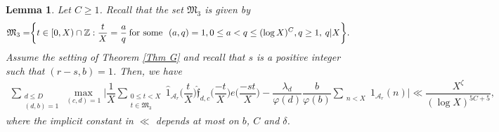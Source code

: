 \documentclass[12pt]{amsart}
\numberwithin{equation}{section}
\newtheorem{lemma}[theorem]{Lemma}
\theoremstyle{remark}
\theoremstyle{definition}
\begin{document}
\begin{lemma}\label{Majorarc3}
Let $C\geq 1$. Recall that the set $\mathfrak{M}_3$ is given by
\begin{align}
\notag \mathfrak{M}_3 =&\bigg\{t \in [0, X)\cap \mathbb{Z}: \dfrac{t}{X}=\dfrac{a}{q}\: \text{for some}~~(a, q)=1, 0\leq a <q\leq (\log X)^C, q\geq 1, \: q\lvert X\bigg\}.
\end{align}
Assume the setting of Theorem \ref{Thm G} and recall that $s$ is a positive integer such that $(r-s, b)=1$. Then, we have
\begin{align}
\label{majorarceqn3} \sum_{\substack{d\leq D\\(d, b)=1}}\max_{(c,d)=1}\bigg\lvert\dfrac{1}{X}
\sum_{\substack{0\leq t<X\\t\in \mathfrak{M}_3}}\widehat{1}_{\mathcal{A}_r}\bigg(\dfrac{t}{X}\bigg)\widehat{\mathfrak{f}}_{d, c}\bigg(\dfrac{-t}{X}\bigg)e\bigg(\dfrac{-st}{X}\bigg)-\dfrac{ \lambda_{d}}{\varphi(d)}\dfrac{b}{\varphi(b)}\sum_{\substack{n< X}}1_{\mathcal{A}_r}(n)\bigg\rvert  \ll \dfrac{X^{\zeta}}{(\log X)^{5C+5}},
\end{align}
where the implicit constant in $\ll$ depends at most on $b$, $C$ and $\delta$.
\end{lemma}
\end{document}
